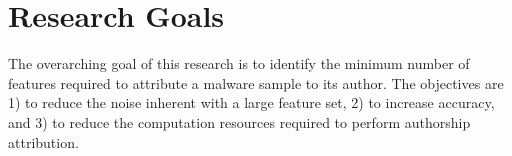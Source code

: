 \documentclass[12pt]{report}
\begin{document}

\section{Research Goals}

The overarching goal of this research is to identify the minimum number of features required to attribute a malware sample to its author.  The objectives are 1) to reduce the noise inherent with a large feature set, 2) to increase accuracy, and 3) to reduce the computation resources required to perform authorship attribution.

\end{document}

